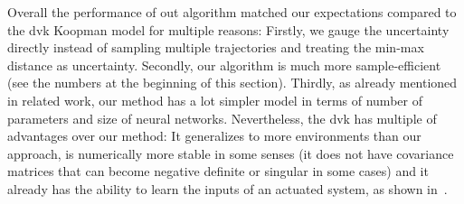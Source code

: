 		Overall the performance of out algorithm matched our expectations compared to the \ac{dvk} Koopman model for multiple reasons: Firstly, we gauge the uncertainty directly instead of sampling multiple trajectories and treating the min-max distance as uncertainty. Secondly, our algorithm is much more sample-efficient (see the numbers at the beginning of this section). Thirdly, as already mentioned in related work, our method has a lot simpler model in terms of number of parameters and size of neural networks. Nevertheless, the \ac{dvk} has multiple of advantages over our method: It generalizes to more environments than our approach, is numerically more stable in some senses (\eg it does not have covariance matrices that can become negative definite or singular in some cases) and it already has the ability to learn the inputs of an actuated system, as shown in~\cite{mortonDeepVariationalKoopman2019a}.

